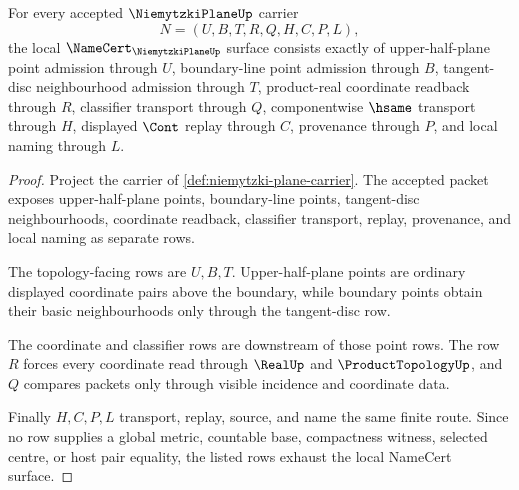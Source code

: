 \begin{theorem}
\label{thm:niemytzki-plane-namecert-obligations}
For every accepted $\NiemytzkiPlaneUp$ carrier
$$
N=(U,B,T,R,Q,H,C,P,L),
$$
the local $\NameCert_{\NiemytzkiPlaneUp}$ surface consists exactly of upper-half-plane point admission through $U$, boundary-line point admission through $B$, tangent-disc neighbourhood admission through $T$, product-real coordinate readback through $R$, classifier transport through $Q$, componentwise $\hsame$ transport through $H$, displayed $\Cont$ replay through $C$, provenance through $P$, and local naming through $L$.
\end{theorem}
\begin{proof}
Project the carrier of \autoref{def:niemytzki-plane-carrier}. The accepted packet exposes upper-half-plane points, boundary-line points, tangent-disc neighbourhoods, coordinate readback, classifier transport, replay, provenance, and local naming as separate rows.

The topology-facing rows are $U,B,T$. Upper-half-plane points are ordinary displayed coordinate pairs above the boundary, while boundary points obtain their basic neighbourhoods only through the tangent-disc row.

The coordinate and classifier rows are downstream of those point rows. The row $R$ forces every coordinate read through $\RealUp$ and $\ProductTopologyUp$, and $Q$ compares packets only through visible incidence and coordinate data.

Finally $H,C,P,L$ transport, replay, source, and name the same finite route. Since no row supplies a global metric, countable base, compactness witness, selected centre, or host pair equality, the listed rows exhaust the local NameCert surface.
\end{proof}

